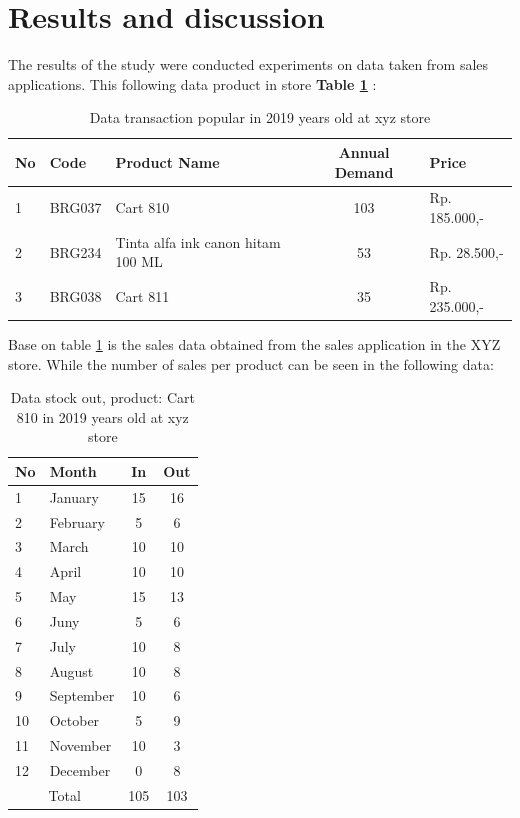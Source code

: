 \documentclass[12pt,a4paper,final]{iopart}
\begin{document}
\section{Results and discussion}
The results of the study were conducted experiments on data taken from sales applications. This following data product in store \textbf{Table \ref{tableBarang}} :
\begin{table}[h!]
	\centering
	\caption{\label{tableBarang} Data transaction popular in 2019 years old at xyz store}
	\begin{tabular}{ lllcl }
		\hline
		\textbf{No} & \textbf{Code} & \textbf{Product Name} & \textbf{Annual Demand} & \textbf{Price} \\
		\hline
		1 & BRG037 & Cart 810 & 103 & Rp. 185.000,-  \\ 
		2 & BRG234 & Tinta alfa ink canon hitam 100 ML & 53 &  Rp. 28.500,-  \\ 
		3 & BRG038 & Cart 811 & 35 & Rp. 235.000,- \\ 
		\hline
	\end{tabular}
\end{table}

Base on table \ref{tableBarang} is the sales data obtained from the sales application in the XYZ store. While the number of sales per product can be seen in the following data:
\begin{table}[h!]
	\centering
	\caption{\label{tableOut} Data stock out, product: Cart 810 in 2019 years old at xyz store}
	\begin{tabular}{ llcc }
		\hline
		\textbf{No} & \textbf{Month} & \textbf{In} & \textbf{Out} \\
		\hline
		1 & January & 15 & 16  \\ 
		2 & February & 5 & 6  \\ 
		3 & March & 10 & 10 \\ 
		4 & April & 10 & 10 \\ 
		5 & May & 15 & 13 \\ 
		6 & Juny & 5 & 6 \\ 
		7 & July & 10 & 8 \\ 
		8 & August & 10 & 8 \\ 
		9 & September & 10 & 6 \\ 
		10 & October & 5 & 9 \\ 
		11 & November & 10 & 3 \\ 
		12 & December & 0 & 8 \\ 
		\hline
		\multicolumn{2}{c}{Total} & {105} & {103}\\
		\hline
	\end{tabular}
\end{table}
\end{document}

